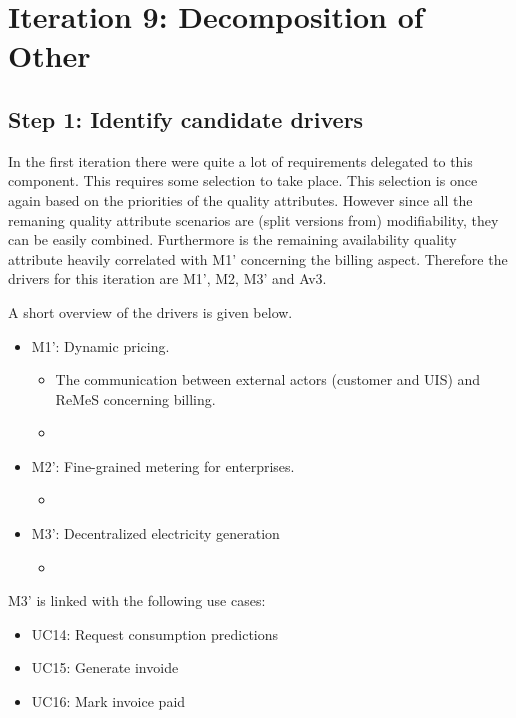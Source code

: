 \section{Iteration 9: Decomposition of Other}
\label{add:it9}

\subsection{Step 1: Identify candidate drivers}
\label{add:it9/drivers}

\npar In the first iteration there were quite a lot of requirements delegated to
this component. This requires some selection to take place. This selection is
once again based on the priorities of the quality attributes. However since all
the remaning quality attribute scenarios are (split versions from)
modifiability, they can be easily combined. Furthermore is the remaining
availability quality attribute heavily correlated with M1' concerning the
billing aspect. Therefore the drivers for this iteration are M1', M2, M3' and
Av3.

\npar A short overview of the drivers is given below.

\begin{itemize}
 	\item M1': Dynamic pricing.
  	\begin{itemize}
    	\item The communication between external actors (customer and UIS)
    	and ReMeS concerning billing.
    	\item 
  	\end{itemize}
  	\item M2': Fine-grained metering for enterprises.
  	\begin{itemize}
  	  \item %
  	\end{itemize}
	\item M3': Decentralized electricity generation
  	\begin{itemize}
  	  \item %
  	\end{itemize}
\end{itemize}

\npar M3' is linked with the following use cases:

\begin{itemize}
  \item UC14: Request consumption predictions
  \item UC15: Generate invoide
  \item UC16: Mark invoice paid
\end{itemize}

